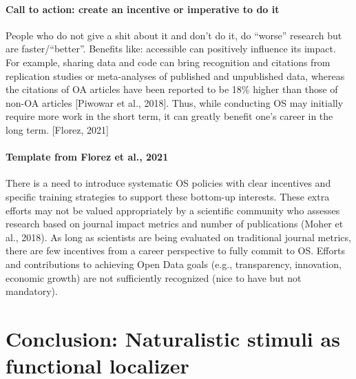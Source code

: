 \paragraph{Call to action: create an incentive or imperative to do it}


%
People who do not give a shit about it and don't do it, do ``worse'' research
but are faster/``better''.
%
Benefits like: accessible can positively influence its impact. For example,
sharing data and code can bring recognition and citations from replication
studies or meta-analyses of published and unpublished data, whereas the
citations of OA articles have been reported to be 18\% higher than those of
non-OA articles [Piwowar et al., 2018].
%
Thus, while conducting OS may initially require more work in the short term, it
can greatly benefit one’s career in the long term. [Florez, 2021]



\paragraph{Template from Florez et al., 2021}


%
There is a need to introduce systematic OS policies with clear incentives and
specific training strategies to support these bottom-up interests.
%
These extra efforts may not be valued appropriately by a scientific community
who assesses research based on journal impact metrics and number of publications
(Moher et al., 2018).
%
As long as scientists are being evaluated on traditional journal metrics, there
are few incentives from a career perspective to fully commit to OS.
%
Efforts and contributions to achieving Open Data goals (e.g., transparency,
innovation, economic growth) are not sufficiently recognized (nice to have but
not mandatory).



\section{Conclusion: Naturalistic stimuli as functional localizer}

